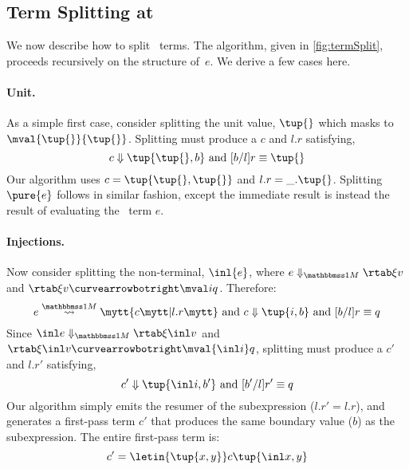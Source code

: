 \begin{abstrsyn}



\subsection{Term Splitting at \bbonem}
\label{sec:split-one}

We now describe how to split \bbonem\ terms. The algorithm, given in
\cref{fig:termSplit}, proceeds recursively on the structure of~$e$. We
derive a few cases here.

\paragraph {Unit.} 
As a simple first case, consider splitting the unit value, $\tup{}$
which masks to $\mval {\tup{}} {\tup{}}$.
Splitting must produce a $c$ and $l.r$ satisfying,
\[
	\reduce c {\tup{\tup{},b}} \text{ and } [b/l]r \equiv \tup{}
\]
Our algorithm uses $c=\tup{\tup{},\tup{}}$ and $l.r = \_.\tup{}$.
Splitting $\pure{e}$ follows in similar fashion, except the immediate
result is instead the result of evaluating the \bbonep\ term $e$.

\paragraph {Injections.}
Now consider splitting the non-terminal, $\inl {e}$, where $\diaone
{e} \xi v$ and $\rtab \xi v \vsplito \mval i q$. Therefore:
\[
	\splitone e A c {l.r} \text{ and } \reduce c {\tup{i,b}} \text{ and } [b/l]r \equiv q
\]
Since $\diaone {\inl e} \xi {\inl v}$ and $\rtab \xi {\inl v} \vsplito \mval {\inl i} q$,
splitting must produce a $c'$ and $l.r'$ satisfying,
\[
	\reduce {c'} {\tup{\inl i,b'}} \text{ and } [b'/l]r' \equiv q
\]
Our algorithm simply emits the resumer of the subexpression ($l.r' =
l.r$), and generates a first-pass term $c'$ that produces the same
boundary value ($b$) as the subexpression. The entire first-pass term
is:
\[
c' = \letin {\tup {x,y}} c {\tup{\inl x, y}}
\]

\end{abstrsyn}
